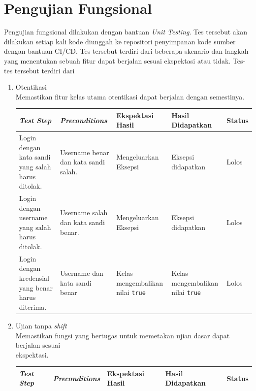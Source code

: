 \section{Pengujian Fungsional}
Pengujian fungsional dilakukan dengan bantuan \textit{Unit Testing}. Tes tersebut akan dilakukan
setiap kali kode diunggah ke repositori penyimpanan kode sumber dengan bantuan CI/CD. Tes tersebut
terdiri dari beberapa skenario dan langkah yang menentukan sebuah fitur dapat berjalan sesuai ekspektasi
atau tidak. Tes-tes tersebut terdiri dari
\begin{enumerate}
    \item Otentikasi\\
        Memastikan fitur kelas utama otentikasi dapat berjalan dengan semestinya.\\
        \begin{longtable}{|p{}|p{}|p{}|p{}|p{}|}
            \hline
            \textit{Test Step} & \textit{Preconditions} & Ekspektasi Hasil & Hasil Didapatkan & Status  \\
            \hline
            \endhead
            Login dengan kata sandi yang salah harus ditolak. & Username benar dan kata sandi salah. & Mengeluarkan Eksepsi & Eksepsi didapatkan & Lolos \\
            \hline
            Login dengan username yang salah harus ditolak. & Username salah dan kata sandi benar. & Mengeluarkan Eksepsi & Eksepsi didapatkan & Lolos \\
            \hline
            Login dengan kredensial yang benar harus diterima. & Username dan kata sandi benar & Kelas mengembalikan nilai \texttt{true} & Kelas mengembalikan nilai \texttt{true} & Lolos \\
            \hline
        \end{longtable}
        
    \item Ujian tanpa \textit{shift}\\
        Memastikan fungsi yang bertugas untuk memetakan ujian dasar dapat berjalan sesuai \\ ekspektasi.\\
         \begin{longtable}{|p{}|p{}|p{}|p{}|p{}|}
            \hline
            \textit{Test Step} & \textit{Preconditions} & Ekspektasi Hasil & Hasil Didapatkan & Status  \\
            \hline
            \endhead
            

\end{longtable}
\end{enumerate}
